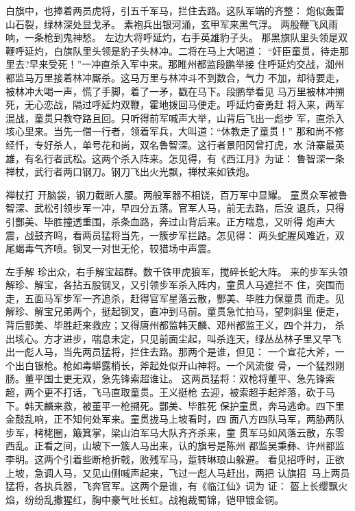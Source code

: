 白旗中，也捧着两员虎将，引五千军马，拦住去路。这队军端的齐整：
炮似轰雷山石裂，绿林深处显戈矛。
素袍兵出银河涌，玄甲军来黑气浮。
两股鞭飞风雨响，一条枪到鬼神愁。
左边大将呼延灼，右手英雄豹子头。
那黑旗队里头领是双鞭呼延灼，白旗队里头领是豹子头林冲。二将在马上大喝道：
“奸臣童贯，待走那里去?早来受死！”一冲直杀入军中来。那睢州都监段鹏举接
住呼延灼交战，洳州都监马万里接着林冲厮杀。这马万里与林冲斗不到数合，气力
不加，却待要走，被林冲大喝一声，慌了手脚，着了一矛，戳在马下。段鹏举看见
马万里被林冲搠死，无心恋战，隔过呼延灼双鞭，霍地拨回马便走。呼延灼奋勇赶
将入来，两军混战，童贯只教夺路且回。只听得前军喊声大举，山背后飞出一彪步
军，直杀入垓心里来。当先一僧一行者，领着军兵，大叫道：“休教走了童贯！”
那和尚不修经忏，专好杀人，单号花和尚，双名鲁智深。这行者景阳冈曾打虎，水
浒寨最英雄，有名行者武松。这两个杀入阵来。怎见得，有《西江月》为证：
鲁智深一条禅杖，武行者两口钢刀。钢刀飞出火光飘，禅杖来如铁炮。

禅杖打
开脑袋，钢刀截断人腰。两般军器不相饶，百万军中显耀。
童贯众军被鲁智深、武松引领步军一冲，早四分五落。官军人马，前无去路，后没
退兵，只得引酆美、毕胜撞透重围，杀条血路，奔过山背后来。正方喘息，又听得
炮声大震，战鼓齐鸣，看两员猛将当先，一簇步军拦路。怎见得：
两头蛇腥风难近，双尾蝎毒气齐喷。钢叉一对世无伦，较猎场中声震。

左手解
珍出众，右手解宝超群。数千铁甲虎狼军，搅碎长蛇大阵。
来的步军头领解珍、解宝，各拈五股钢叉，又引领步军杀入阵内，童贯人马遮拦不
住，突围而走，五面马军步军一齐追杀，赶得官军星落云散，酆美、毕胜力保童贯
而走。见解珍、解宝兄弟两个，挺起钢叉，直冲到马前。童贯急忙拍马，望刺斜里
便走，背后酆美、毕胜赶来救应；又得唐州都监韩天麟、邓州都监王义，四个并力，
杀出垓心。方才进步，喘息未定，只见前面尘起，叫杀连天，绿丛丛林子里又早飞
出一彪人马，当先两员猛将，拦住去路。那两个是谁，但见：
一个宣花大斧，一个出白银枪。枪如毒蟒露梢长，斧起处似开山神将。一个风流俊
骨，一个猛烈刚肠。董平国士更无双，急先锋索超谁让。
这两员猛将：双枪将董平、急先锋索超，两个更不打话，飞马直取童贯。王义挺枪
去迎，被索超手起斧落，砍于马下。韩天麟来救，被董平一枪搠死。酆美、毕胜死
保护童贯，奔马逃命。四下里金鼓乱响，正不知何处军来。童贯拢马上坡看时，四
面八方四队马军，两胁两队步军，栲栳圈，簸箕掌，梁山泊军马大队齐齐杀来，童
贯军马如风落云散，东零西乱。正看之间，山坡下一簇人马出来，认的旗号是陈州
都监吴秉彝、许州都监李明。这两个引着些断枪折戟，败残军马，踅转琳琅山躲避。
看见招呼时，正欲上坡，急调人马，又见山侧喊声起来，飞过一彪人马赶出，两把
认旗招，马上两员猛将，各执兵器，飞奔官军。这两个是谁，有《临江仙》词为
证：
盔上长缨飘火焰，纷纷乱撒猩红，胸中豪气吐长虹。战袍裁蜀锦，铠甲镀金铜。

